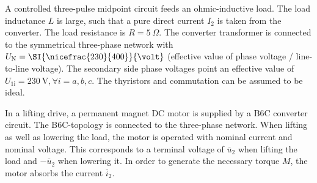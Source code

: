

A controlled three-pulse midpoint circuit feeds an ohmic-inductive load. The load inductance $L$ is large, such that a pure direct current $I_\mathrm{2}$ is taken from the converter. The load resistance is $R = \SI{5}{\Omega}$. The converter transformer 
is connected to the symmetrical three-phase network with $U_\mathrm{N} = \SI{\nicefrac{230}{400}}{\volt} $ (effective value of phase voltage / line-to-line voltage). The secondary side phase voltages point an effective value of 
$U_\mathrm{1i} = \SI{230}{\volt}, \forall i=a,b,c$. The thyristors and commutation can be assumed to be ideal.





In a lifting drive, a permanent magnet DC motor is supplied by a B6C converter circuit. The B6C-topology is connected to the three-phase network.
When lifting as well as lowering the load, the motor is operated with nominal current and nominal voltage. 
This corresponds to a terminal voltage of $\overline{u}_\mathrm{2}$ when lifting the load and $-\overline{u}_\mathrm{2}$ when lowering it.
In order to generate the necessary torque $M$, the motor absorbs the current $\overline{i}_\mathrm{2}$.

